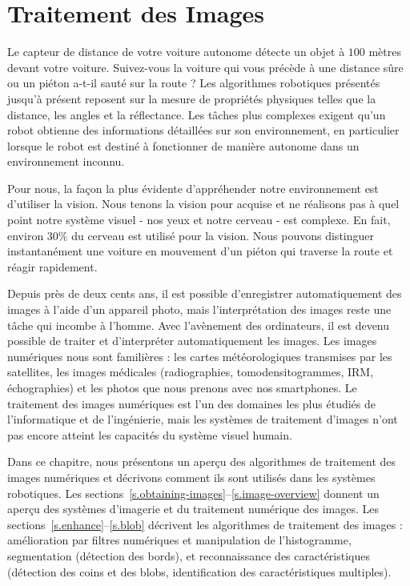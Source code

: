 
\chapter{Traitement des Images}\label{ch.image}

Le capteur de distance de votre voiture autonome détecte un objet à $100$ mètres devant votre voiture. Suivez-vous la voiture qui vous précède à une distance sûre ou un piéton a-t-il sauté sur la route ? Les algorithmes robotiques présentés jusqu'à présent reposent sur la mesure de propriétés physiques telles que la distance, les angles et la réflectance. Les tâches plus complexes exigent qu'un robot obtienne des informations détaillées sur son environnement, en particulier lorsque le robot est destiné à fonctionner de manière autonome dans un environnement inconnu.

Pour nous, la façon la plus évidente d'appréhender notre environnement est d'utiliser la vision. Nous tenons la vision pour acquise et ne réalisons pas à quel point notre système visuel - nos yeux et notre cerveau - est complexe. En fait, environ $30\%$ du cerveau est utilisé pour la vision. Nous pouvons distinguer instantanément une voiture en mouvement d'un piéton qui traverse la route et réagir rapidement.

Depuis près de deux cents ans, il est possible d'enregistrer automatiquement des images à l'aide d'un appareil photo, mais l'interprétation des images reste une tâche qui incombe à l'homme. Avec l'avènement des ordinateurs, il est devenu possible de traiter et d'interpréter automatiquement les images. Les images numériques nous sont familières : les cartes météorologiques transmises par les satellites, les images médicales (radiographies, tomodensitogrammes, IRM, échographies) et les photos que nous prenons avec nos smartphones. Le traitement des images numériques est l'un des domaines les plus étudiés de l'informatique et de l'ingénierie, mais les systèmes de traitement d'images n'ont pas encore atteint les capacités du système visuel humain.

Dans ce chapitre, nous présentons un aperçu des algorithmes de traitement des images numériques et décrivons comment ils sont utilisés dans les systèmes robotiques. Les sections~\ref{s.obtaining-images}--\ref{s.image-overview} donnent un aperçu des systèmes d'imagerie et du traitement numérique des images. Les sections~\ref{s.enhance}--\ref{s.blob} décrivent les algorithmes de traitement des images : amélioration par filtres numériques et manipulation de l'histogramme, segmentation (détection des bords), et reconnaissance des caractéristiques (détection des coins et des blobs, identification des caractéristiques multiples).

